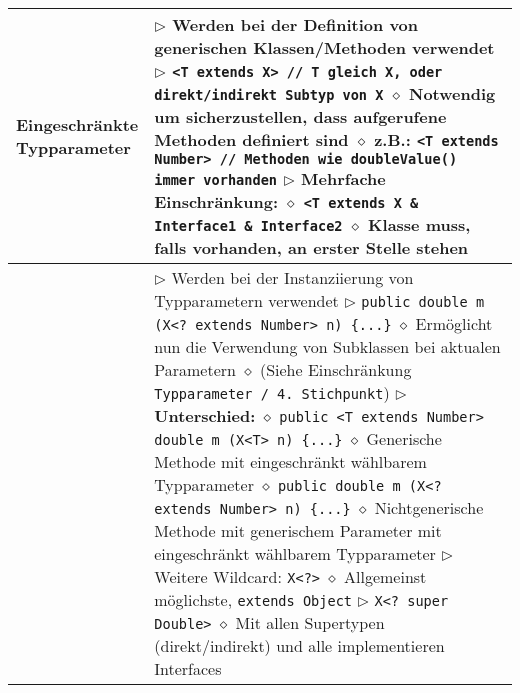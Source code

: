 \begin{longtable}{ | p{4cm} p{13.5cm} | }
	\makecell[l]{Eingeschränkte \\ Typparameter} & \makecell[l]{$\rhd$ Werden bei der Definition von generischen Klassen/Methoden verwendet \\
	$\rhd$ \texttt{<T extends X> // T gleich X, oder direkt/indirekt Subtyp von X} \\
	\hspace{0.4cm} $\diamond$ Notwendig um sicherzustellen, dass aufgerufene Methoden definiert sind \\
	\hspace{0.4cm} $\diamond$ z.B.: \texttt{<T extends Number> // Methoden wie doubleValue() immer vorhanden} \\
	$\rhd$ Mehrfache Einschränkung:  \\
	\hspace{0.4cm} $\diamond$ \texttt{<T extends X \& Interface1 \& Interface2} \\
	\hspace{0.4cm} $\diamond$ Klasse muss, falls vorhanden, an erster Stelle stehen} \\ \hline

	\makecell[l]{Wildcards} & \makecell[l]{$\rhd$ Werden bei der Instanziierung von Typparametern verwendet \\
	$\rhd$ \texttt{public double m (X<? extends Number> n) \{...\}} \\
	\hspace{0.4cm} $\diamond$ Ermöglicht nun die Verwendung von Subklassen bei aktualen Parametern \\
	\hspace{0.4cm} $\diamond$ (Siehe Einschränkung \texttt{Typparameter / 4. Stichpunkt}) \\
	$\rhd$ \textbf{Unterschied:} \\
	\hspace{0.4cm} $\diamond$ \texttt{public <T extends Number> double m (X<T> n) \{...\}} \\
	\hspace{0.6cm} $\diamond$ Generische Methode mit eingeschränkt wählbarem Typparameter \\
	\hspace{0.4cm} $\diamond$ \texttt{public double m (X<? extends Number> n) \{...\}} \\
	\hspace{0.6cm} $\diamond$ Nichtgenerische Methode mit generischem Parameter mit eingeschränkt \\
	\hspace{1cm} wählbarem Typparameter \\
	$\rhd$ Weitere Wildcard: \texttt{X<?>} \\
	\hspace{0.4cm} $\diamond$ Allgemeinst möglichste, \texttt{extends Object} \\
	$\rhd$ \texttt{X<? super Double>} \\
	\hspace{0.4cm} $\diamond$ Mit allen Supertypen (direkt/indirekt) und alle implementieren Interfaces} \\ \hline


\end{longtable}
